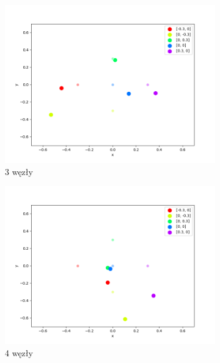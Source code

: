 \begin{figure}[h]
\centering
\begin{subfigure}{.5\textwidth}
    \centering
    \includegraphics[width=\linewidth]{pics/mult_lat_2d_num/positions_3_mean.png}
\caption{3 węzły}
\label{pic:2d_3_num_mult}
\end{subfigure}%
\begin{subfigure}{.5\textwidth}
    \centering
    \includegraphics[width=\linewidth]{pics/mult_lat_2d_num/positions_4_mean.png}
\caption{4 węzły}
\label{pic:2d_4_num_mult}
\end{subfigure}
\begin{subfigure}{.5\textwidth}
    \centering

\end{subfigure}
\end{figure}
